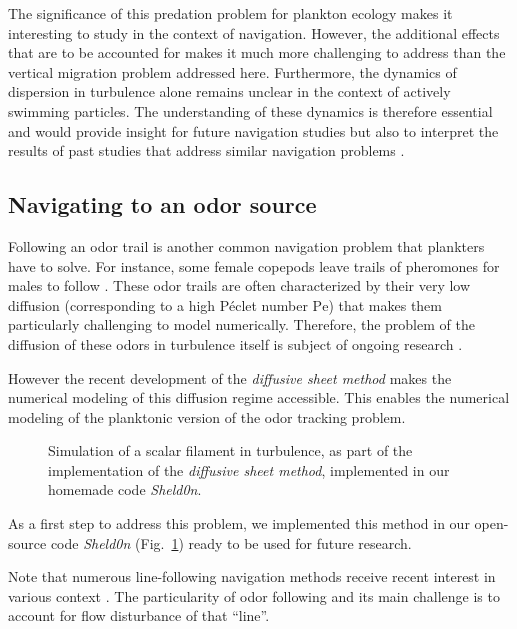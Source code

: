 The significance of this predation problem for plankton ecology makes it interesting to study in the context of navigation.
However, the additional effects that are to be accounted for makes it much more challenging to address than the vertical migration problem addressed here.
Furthermore, the dynamics of dispersion in turbulence alone remains unclear in the context of actively swimming particles.
The understanding of these dynamics is therefore essential and would provide insight for future navigation studies but also to interpret the results of past studies that address similar navigation problems \citep{alageshan2020machine}.

\subsection{Navigating to an odor source}\label{sec:navigating_odor_source}

Following an odor trail is another common navigation problem that plankters have to solve.
For instance, some female copepods leave trails of pheromones for males to follow \citep{weissburg1998following, bagoien2005blind, yen2010chemical}.
These odor trails are often characterized by their very low diffusion (corresponding to a high Péclet number $\mathrm{Pe}$) that makes them particularly challenging to model numerically.
Therefore, the problem of the diffusion of these odors in turbulence itself is subject of ongoing research \citep{roberts2002turbulent}.

However the recent development of the \textit{diffusive sheet method} \citep{martinez2018diffusive} makes the numerical modeling of this diffusion regime accessible.
This enables the numerical modeling of the planktonic version of the odor tracking problem.
\begin{figure}
    \centering
    \def\svgwidth{0.9\textwidth}
    
    \caption{
    	Simulation of a scalar filament in turbulence, as part of the implementation of the \textit{diffusive sheet method}, implemented in our homemade code \textit{Sheld0n}.
    }
    \label{fig:filament}
\end{figure}
As a first step to address this problem, we implemented this method in our open-source code \textit{Sheld0n} (Fig.~\ref{fig:filament}) ready to be used for future research.

Note that numerous line-following navigation methods receive recent interest in various context \citep{yao2020path}.
The particularity of odor following and its main challenge is to account for flow disturbance of that ``line''.

